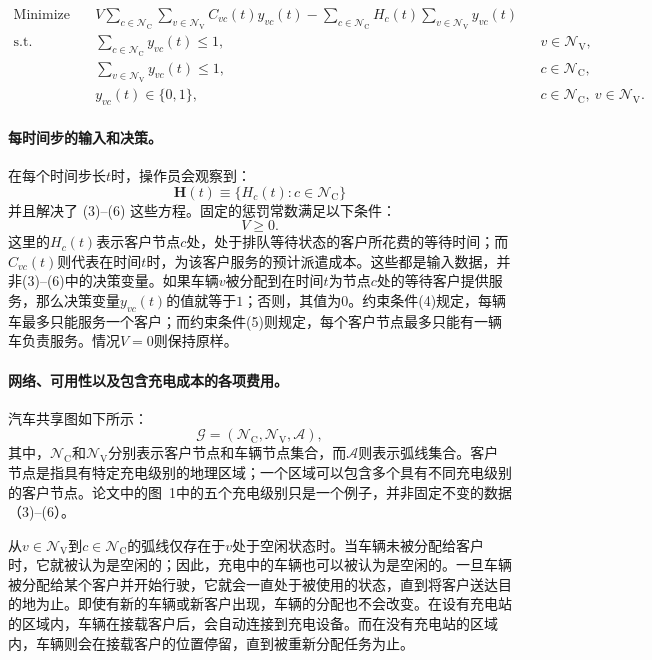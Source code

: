 \documentclass{article}
\begin{document}
\begin{align}
\text{Minimize}\quad &V\sum_{c\in\mathcal N_{\mathrm C}}\sum_{v\in\mathcal N_{\mathrm V}} C_{vc}(t)y_{vc}(t)
-\sum_{c\in\mathcal N_{\mathrm C}}H_c(t)\sum_{v\in\mathcal N_{\mathrm V}}y_{vc}(t) \tag{3}\\
\text{s.t.}\quad &\sum_{c\in\mathcal N_{\mathrm C}}y_{vc}(t)\leq 1,
&&v\in\mathcal N_{\mathrm V}, \tag{4}\\
&\sum_{v\in\mathcal N_{\mathrm V}}y_{vc}(t)\leq 1,
&&c\in\mathcal N_{\mathrm C}, \tag{5}\\
&y_{vc}(t)\in\{0,1\},
&&c\in\mathcal N_{\mathrm C},\ v\in\mathcal N_{\mathrm V}. \tag{6}
\end{align}

\paragraph{每时间步的输入和决策。}
在每个时间步长$t$时，操作员会观察到：
\[
\mathbf H(t)\equiv\{H_c(t):c\in\mathcal N_{\mathrm C}\}
\]
并且解决了 (3)--(6) 这些方程。固定的惩罚常数满足以下条件：
\[
V\geq 0.
\]
这里的$H_c(t)$表示客户节点$c$处，处于排队等待状态的客户所花费的等待时间；而$C_{vc}(t)$则代表在时间$t$时，为该客户服务的预计派遣成本。这些都是输入数据，并非(3)--(6)中的决策变量。如果车辆$v$被分配到在时间$t$为节点$c$处的等待客户提供服务，那么决策变量$y_{vc}(t)$的值就等于$1$；否则，其值为$0$。约束条件(4)规定，每辆车最多只能服务一个客户；而约束条件(5)则规定，每个客户节点最多只能有一辆车负责服务。情况$V=0$则保持原样。

\paragraph{网络、可用性以及包含充电成本的各项费用。}
汽车共享图如下所示：
\[
\mathcal G=(\mathcal N_{\mathrm C},\mathcal N_{\mathrm V},\mathcal A),
\]
其中，$\mathcal N_{\mathrm C}$和$\mathcal N_{\mathrm V}$分别表示客户节点和车辆节点集合，而$\mathcal A$则表示弧线集合。客户节点是指具有特定充电级别的地理区域；一个区域可以包含多个具有不同充电级别的客户节点。论文中的图~1中的五个充电级别只是一个例子，并非固定不变的数据（3)--(6）。

从$v\in\mathcal N_{\mathrm V}$到$c\in\mathcal N_{\mathrm C}$的弧线仅存在于$v$处于空闲状态时。当车辆未被分配给客户时，它就被认为是空闲的；因此，充电中的车辆也可以被认为是空闲的。一旦车辆被分配给某个客户并开始行驶，它就会一直处于被使用的状态，直到将客户送达目的地为止。即使有新的车辆或新客户出现，车辆的分配也不会改变。在设有充电站的区域内，车辆在接载客户后，会自动连接到充电设备。而在没有充电站的区域内，车辆则会在接载客户的位置停留，直到被重新分配任务为止。
\end{document}
